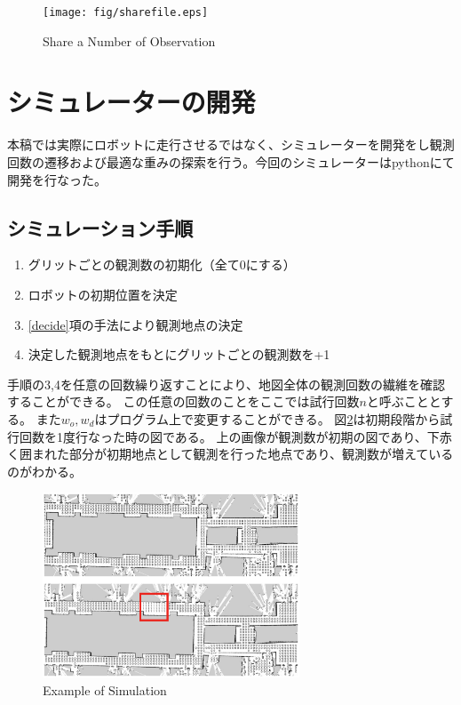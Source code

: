 \documentclass{jsarticle}
\begin{document}
\begin{figure}[tbh]
 \centering
  \texttt{[image: fig/sharefile.eps]}
  \vspace*{-4mm}
  \caption{Share a Number of Observation}
  \label{fig: sharefile}
\end{figure}




\section{シミュレーターの開発}
\label{simulation}
本稿では実際にロボットに走行させるではなく、シミュレーターを開発をし観測回数の遷移および最適な重みの探索を行う。今回のシミュレーターはpythonにて開発を行なった。
\subsection{シミュレーション手順}
\label{process-simulation}
\begin{enumerate}
  \item グリットごとの観測数の初期化（全て0にする）
  \item ロボットの初期位置を決定
  \item \ref{decide}項の手法により観測地点の決定
  \item 決定した観測地点をもとにグリットごとの観測数を+1
\end{enumerate}
手順の3,4を任意の回数繰り返すことにより、地図全体の観測回数の繊維を確認することができる。
この任意の回数のことをここでは試行回数$n$と呼ぶこととする。
また$w_o,w_d$はプログラム上で変更することができる。
図\ref{fig: example of simulation}は初期段階から試行回数を1度行なった時の図である。
上の画像が観測数が初期の図であり、下赤く囲まれた部分が初期地点として観測を行った地点であり、観測数が増えているのがわかる。

\begin{figure}[tbh]
 \centering
  \includegraphics[height=55mm]{fig/example.eps}
  \vspace*{-4mm}
  \caption{Example of Simulation}
  \label{fig: example of simulation}
\end{figure}
\end{document}
